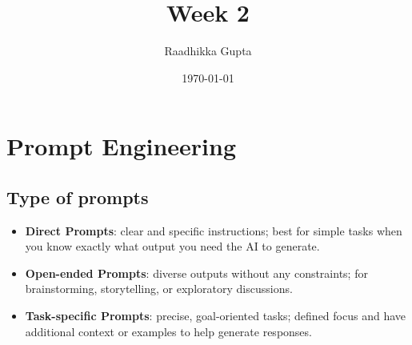 \documentclass[12pt, letterpaper]{article}
\title{Week 2}
\author{Raadhikka Gupta}
\date{\today}
\begin{document}
\maketitle

\section{Prompt Engineering}

\subsection{Type of prompts}
\begin{itemize}
    \item \textbf{Direct Prompts}: clear and specific instructions; best for simple tasks when you know exactly what output you need the AI to generate.
    \item \textbf{Open-ended Prompts}: diverse outputs without any constraints; for brainstorming, storytelling, or exploratory discussions.
    \item \textbf{Task-specific Prompts}: precise, goal-oriented tasks; defined focus and have additional context or examples to help generate responses.
\end{itemize}
\end{document}
